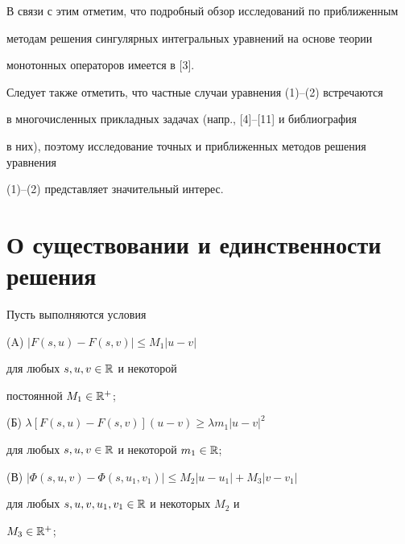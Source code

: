 В связи с этим отметим, что подробный обзор исследований по приближенным


методам решения сингулярных интегральных уравнений на основе теории


монотонных операторов имеется в [3].





Следует также отметить, что частные случаи уравнения (1)--(2) встречаются


в многочисленных прикладных задачах (напр., [4]--[11] и библиография


в них), поэтому исследование точных и приближенных методов решения уравнения


(1)--(2) представляет значительный интерес.





\section{О существовании и единственности решения}





Пусть выполняются условия





(A) $|F(s,u)-F(s,v)|\leq M_1 |u-v|$





\noindent{}для любых $s,u,v\in \Bbb R$ и некоторой 


постоянной $M_1\in \Bbb R^+$;





(Б) $\lambda[F(s,u)-F(s,v)](u-v)\geq\lambda m_1 |u-v|^2$





\noindent{}для любых $s,u,v\in \Bbb R$ и некоторой $m_1\in \Bbb R$;





(В) $|\Phi(s,u,v)-\Phi(s,u_1,v_1)|\leq M_2 |u-u_1|+M_3 |v-v_1|$





\noindent{}для любых $s,u,v,u_1,v_1\in \Bbb R$ и некоторых $M_2$ и


$M_3\in \Bbb R^+$;






